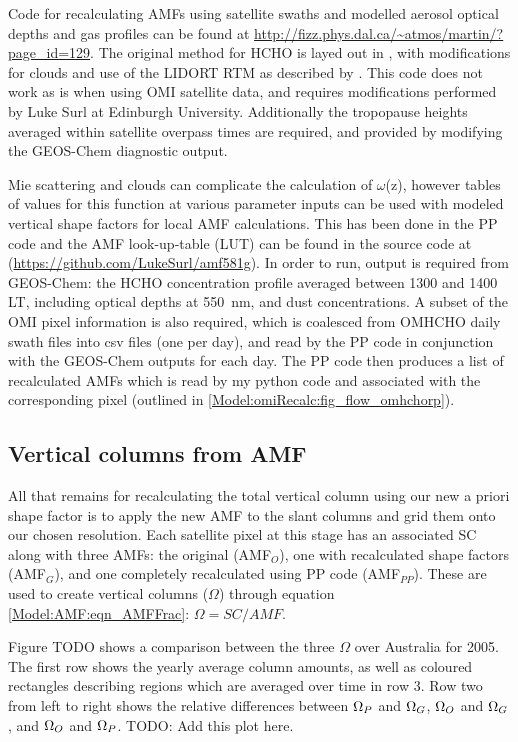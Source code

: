     Code for recalculating AMFs using satellite swaths and modelled aerosol optical depths and gas profiles can be found at \url{http://fizz.phys.dal.ca/~atmos/martin/?page_id=129}. 
    The original method for HCHO is layed out in \textcite{Palmer2001}, with modifications for clouds and use of the LIDORT RTM \parencite{Spurr2002} as described by \textcite{Martin2003}.
    This code does not work as is when using OMI satellite data, and requires modifications performed by Luke Surl at Edinburgh University.
    Additionally the tropopause heights averaged within satellite overpass times are required, and provided by modifying the GEOS-Chem diagnostic output.
    
    Mie scattering and clouds can complicate the calculation of $\omega$(z), however tables of values for this function at various parameter inputs can be used with modeled vertical shape factors for local AMF calculations.
    This has been done in the PP code and the AMF look-up-table (LUT) can be found in the source code at (\url{https://github.com/LukeSurl/amf581g}).
    In order to run, output is required from GEOS-Chem: the HCHO concentration profile averaged between 1300 and 1400 LT, including optical depths at 550~nm, and dust concentrations.
    A subset of the OMI pixel information is also required, which is coalesced from OMHCHO daily swath files into csv files (one per day), and read by the PP code in conjunction with the GEOS-Chem outputs for each day.
    The PP code then produces a list of recalculated AMFs which is read by my python code and associated with the corresponding pixel (outlined in \ref{Model:omiRecalc:fig_flow_omhchorp}).
    
    
  \subsection{Vertical columns from AMF}
    
    All that remains for recalculating the total vertical column using our new a priori shape factor is to apply the new AMF to the slant columns and grid them onto our chosen resolution.
    Each satellite pixel at this stage has an associated SC along with three AMFs: the original (AMF$_O$), one with recalculated shape factors (AMF$_G$), and one completely recalculated using PP code (AMF$_{PP}$).
    These are used to create vertical columns ($\Omega$) through equation \ref{Model:AMF:eqn_AMFFrac}: $\Omega = SC/AMF$.
    
    Figure TODO shows a comparison between the three $\Omega$ over Australia for 2005. 
    The first row shows the yearly average column amounts, as well as coloured rectangles describing regions which are averaged over time in row 3.
    Row two from left to right shows the relative differences between $\Omega_{P}$ and $\Omega_{G}$, $\Omega_{O}$ and $\Omega_{G}$, and $\Omega_{O}$ and $\Omega_{P}$.
    TODO: Add this plot here.
    
